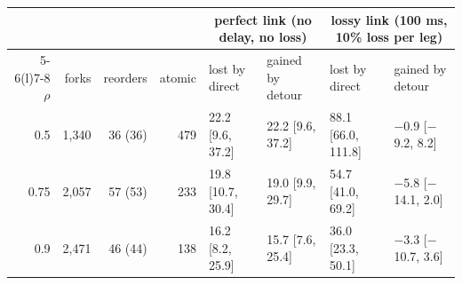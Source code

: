\begin{tabular}{@{}rrrr ll ll@{}}\toprule
& & & & \multicolumn{2}{c}{perfect link (no delay, no loss)} & \multicolumn{2}{c}{lossy link (100 ms, 10\% loss per leg)}\\\cmidrule(lr){5-6}\cmidrule(l){7-8}
$\rho$ & forks & reorders & atomic & lost by direct & gained by detour & lost by direct & gained by detour\\\midrule
0.5 & 1,340 & 36 (36) & 479 & 22.2 [9.6, 37.2] & 22.2 [9.6, 37.2] & 88.1 [66.0, 111.8] & $-$0.9 [$-$9.2, 8.2]\\
0.75 & 2,057 & 57 (53) & 233 & 19.8 [10.7, 30.4] & 19.0 [9.9, 29.7] & 54.7 [41.0, 69.2] & $-$5.8 [$-$14.1, 2.0]\\
0.9 & 2,471 & 46 (44) & 138 & 16.2 [8.2, 25.9] & 15.7 [7.6, 25.4] & 36.0 [23.3, 50.1] & $-$3.3 [$-$10.7, 3.6]\\
\bottomrule\end{tabular}
